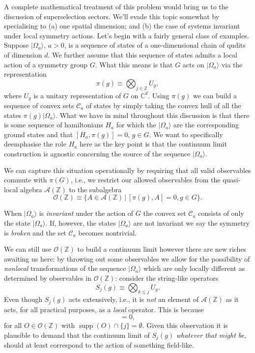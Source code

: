 \documentclass[prl,twocolumn,lengthcheck,superscriptaddress]{revtex4-1}
\newcommand{\supp}{\operatorname{supp}}
\theoremstyle{definition}
\theoremstyle{remark}
\begin{document}
A complete mathematical treatment of this problem would bring us to the discussion of superselection sectors. We'll evade this topic somewhat by specialising to (a) one spatial dimension; and (b) the case of systems invariant under local symmetry actions. Let's begin with a fairly general class of examples. Suppose $|\Omega_a\rangle$, $a>0$, is a sequence of states of a one-dimensional chain of qudits of dimension $d$. We further assume that this sequence of states admits a local action of a symmetry group $G$. What this means is that $G$ acts on $|\Omega_a\rangle$ via the representation
\begin{equation}
	\pi(g) \equiv \bigotimes_{j\in\mathbb{Z}} U_g,
\end{equation}
where $U_g$ is a unitary representation of $G$ on $\mathbb{C}^d$. Using $\pi(g)$ we can build a sequence of convex sets $\mathcal{C}_a$ of states by simply taking the convex hull of all the states $\pi(g)|\Omega_a\rangle$. What we have in mind throughout this discussion is that there is some sequence of hamiltonians $H_a$ for which the $|\Omega_a\rangle$ are the corresponding ground states and that $[H_a, \pi(g)] = 0$, $g\in G$. We want to specifically deemphasise the role $H_a$ here as the key point is that the continuum limit construction is agnostic concerning the source of the sequence $|\Omega_a\rangle$. 

We can capture this situation operationally by requiring that all valid observables commute with $\pi(G)$, i.e., we restrict our allowed observables from the quasi-local algebra $\mathcal{A}(\mathbb{Z})$ to the subalgebra 
\begin{equation}
	\mathcal{O}(\mathbb{Z}) \equiv \{A\in \mathcal{A}(\mathbb{Z})\,|\, [\pi(g),A] = 0, g \in G\}.
\end{equation}

When $|\Omega_a\rangle$ is \emph{invariant} under the action of $G$ the convex set $\mathcal{C}_a$ consists of only the state $|\Omega_a\rangle$. If, however, the states $|\Omega_a\rangle$ are not invariant we say the symmetry is \emph{broken} and the set $\mathcal{C}_a$ becomes nontrivial. 

We can still use $\mathcal{O}(\mathbb{Z})$ to build a continuum limit however there are new riches awaiting us here: by throwing out some observables we allow for the possibility of \emph{nonlocal} transformations of the sequence $|\Omega_a\rangle$ which are only locally different as determined by observables in $\mathcal{O}(\mathbb{Z})$: consider the string-like operators
\begin{equation}
	S_j(g) \equiv \bigotimes_{k\le j} U_g.
\end{equation}
Even though $S_j(g)$ acts extensively, i.e., it is \emph{not} an element of $\mathcal{A}(\mathbb{Z})$ as it acts, for all practical purposes, as a \emph{local} operator. This is because 
\begin{equation}
	[O, S_j(g)] = 0,
\end{equation}
for all $O\in \mathcal{O}(\mathbb{Z})$ with $\supp(O) \cap \{j\} = \emptyset$.
Given this observation it is plausible to demand that the continuum limit of $S_j(g)$ \emph{whatever that might be}, should at least correspond to the action of something field-like. 
\end{document}
